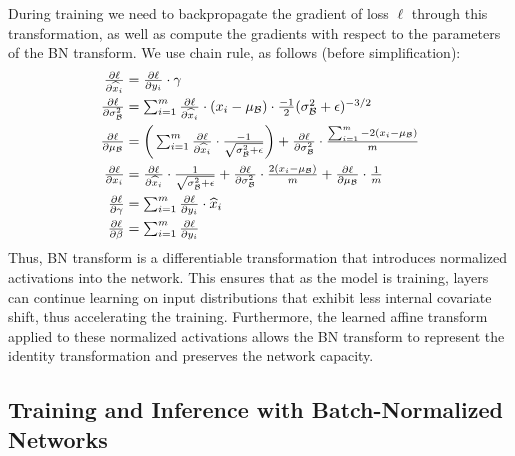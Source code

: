 \documentclass[twocolumn]{article}
\begin{document}
During training we need to  backpropagate the gradient of loss $\ell$ through
this transformation, as well  as  compute the  gradients with respect to the parameters of the BN transform. We use  chain rule, as follows (before
simplification):
\begin{align*}
\textstyle\frac{\partial \ell}{\partial \widehat{x}_i} &\textstyle= \frac{\partial \ell}{\partial y_i}\cdot \gamma \\ 
\textstyle\frac{\partial \ell}{\partial \sigma_{\mathcal{B}}^2}
&\textstyle= \sum_{i=1}^m \frac{\partial \ell}{\partial \widehat{x}_i}\cdot(x_i-\mu_{\mathcal{B}})\cdot
\frac{-1}{2}(\sigma_{\mathcal{B}}^2+\epsilon)^{-3/2} \\ 
\textstyle\frac{\partial \ell}{\partial \mu_{\mathcal{B}}} &\textstyle=
\bigg(\sum_{i=1}^m \frac{\partial \ell}{\partial \widehat{x}_i}\cdot
\frac{-1}{\sqrt{\sigma_{\mathcal{B}}^2+\epsilon}}\bigg) +
\frac{\partial \ell}{\partial \sigma_{\mathcal{B}}^2}\cdot\frac{   \sum_{i=1}^m
  -2(x_i-\mu_{\mathcal{B}})}{m}\\
 \textstyle  \frac{\partial \ell}{\partial x_i} &\textstyle= \frac{\partial \ell}{\partial \widehat{x}_i} \cdot
\frac{1}{\sqrt{\sigma_{\mathcal{B}}^2+\epsilon}} + \frac{\partial \ell}{\partial \sigma_{\mathcal{B}}^2}\cdot
\frac{2(x_i-\mu_{\mathcal{B}})}{m} + \frac{\partial \ell}{\partial \mu_{\mathcal{B}}}\cdot \frac{1}{m}\\
\textstyle\frac{\partial \ell}{\partial \gamma}&\textstyle= \sum_{i=1}^m \frac{\partial \ell}{\partial y_i} \cdot \widehat{x}_i
  \\ 
\textstyle  \frac{\partial \ell}{\partial \beta} &\textstyle= \sum_{i=1}^m \frac{\partial \ell}{\partial y_i}
\end{align*}
Thus, BN transform is a differentiable transformation that introduces  normalized activations
into the network. This ensures that as the model is training, layers can continue learning on input distributions that exhibit less internal covariate shift, thus accelerating the training.
Furthermore, the learned affine transform applied to these normalized activations allows the BN transform  to represent the identity transformation and preserves the network capacity.

\subsection{Training and Inference with Batch-Normalized Networks}
\label{sec-training}
\end{document}
